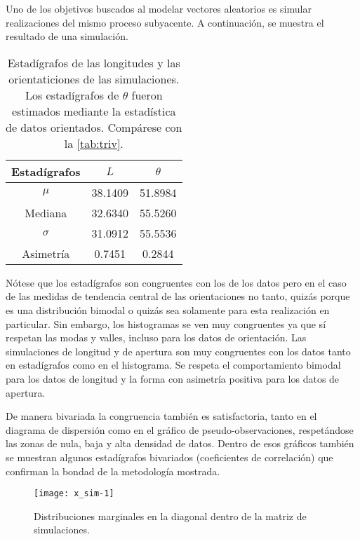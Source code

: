 Uno de los objetivos buscados al modelar vectores aleatorios es simular realizaciones del mismo proceso subyacente. A continuaci\'on, se muestra el resultado de una simulaci\'on.
\begin{table}[htpb]
\begin{center}
	\begin{tabular}{|c|c|c|} %
		\hline %
		\textbf{Estad\'igrafos} & \textbf{$L$} & \textbf{$\theta$} \\
		\hline\hline
		$\mu$    & 38.1409 & 51.8984\\
		Mediana   & 32.6340 & 55.5260\\
		$\sigma$ & 31.0912 & 55.5536\\
		Asimetr\'ia & 0.7451  & 0.2844 \\ \hline
	\end{tabular}
\end{center}
    \caption{Estad\'igrafos de las longitudes y las orientaticiones de las simulaciones. Los estad\'igrafos de $\theta$ fueron estimados mediante la estad\'istica de datos orientados. Comp\'arese con la \autoref{tab:triv}.}
    \label{tab:trivSim}
\end{table}


N\'otese que los estad\'igrafos son congruentes con los de los datos pero en el caso de las medidas de tendencia central de las orientaciones no tanto, quiz\'as porque es una distribuci\'on bimodal o quiz\'as sea solamente para esta realizaci\'on en particular. Sin embargo, los histogramas se ven muy congruentes ya que s\'i respetan las modas y valles, incluso para los datos de orientaci\'on. Las simulaciones de longitud y de apertura son muy congruentes con los datos tanto en estad\'igrafos como en el histograma. Se respeta el comportamiento bimodal para los datos de longitud y la forma con asimetr\'ia positiva para los datos de apertura.

De manera bivariada la congruencia tambi\'en es satisfactoria, tanto en el diagrama de dispersi\'on como en el gr\'afico de pseudo-observaciones, respet\'andose las zonas de nula, baja y alta densidad de datos. Dentro de esos gr\'aficos tambi\'en se muestran algunos estad\'igrafos bivariados (coeficientes de correlaci\'on) que confirman la bondad de la metodolog\'ia mostrada.


\begin{figure}
	\centering
	\texttt{[image: x\_sim-1]}
	\caption{Distribuciones marginales en la diagonal dentro de la matriz de simulaciones.}
\end{figure}

